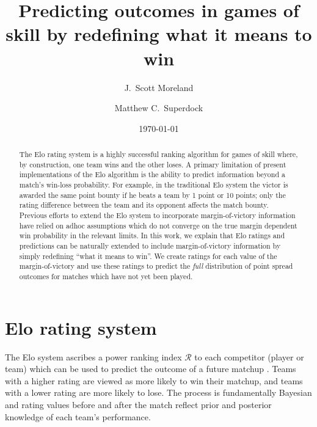 \documentclass[aps,prc,reprint,amsmath,superscriptaddress]{revtex4-1}
\newcommand{\R}{\mathcal{R}}
\begin{document}
\title{Predicting outcomes in games of skill by redefining what it means to win}

\author{J.\ Scott Moreland}
\author{Matthew C.\ Superdock}

\date{\today}


\begin{abstract}
The Elo rating system is a highly successful ranking algorithm for games of skill where, by construction, one team wins and the other loses.
A primary limitation of present implementations of the Elo algorithm is the ability to predict information beyond a match's win-loss probability.
For example, in the traditional Elo system the victor is awarded the same point bounty if he beats a team by 1 point or 10 points; only the rating difference between the team and its opponent affects the match bounty.
Previous efforts to extend the Elo system to incorporate margin-of-victory information have relied on adhoc assumptions which do not converge on the true margin dependent win probability in the relevant limits.
In this work, we explain that Elo ratings and predictions can be naturally extended to include margin-of-victory information by simply redefining ``what it means to win''.
We create ratings for each value of the margin-of-victory and use these ratings to predict the \emph{full} distribution of point spread outcomes for matches which have not yet been played.
\end{abstract}


\maketitle

\section{Elo rating system}

The Elo system ascribes a power ranking index $\R$ to each competitor (player or team) which can be used to predict the outcome of a future matchup \cite{elo1978rating}.
Teams with a higher rating are viewed as more likely to win their matchup, and teams with a lower rating are more likely to lose.
The process is fundamentally Bayesian and rating values before and after the match reflect prior and posterior knowledge of each team's performance.
\end{document}
